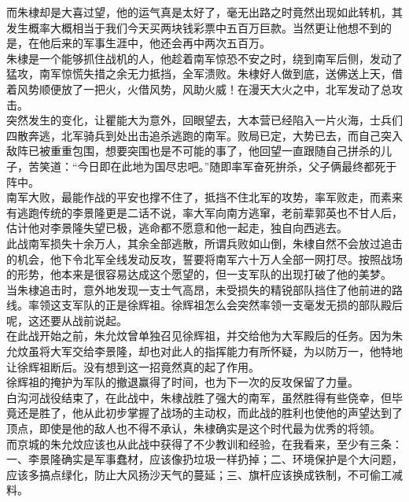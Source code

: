\begin{multicols}{\theparacolNo}
而朱棣却是大喜过望，他的运气真是太好了，毫无出路之时竟然出现如此转机，其发生概率大概相当于我们今天买两块钱彩票中五百万巨款。当然更让他想不到的是，在他后来的军事生涯中，他还会再中两次五百万。\\

朱棣是一个能够抓住战机的人，他趁着南军惊恐不安之时，绕到南军后侧，发动了猛攻，南军惊慌失措之余无力抵挡，全军溃败。朱棣好人做到底，送佛送上天，借着风势顺便放了一把火，火借风势，风助火威！在漫天大火之中，北军发动了总攻击。\\

突然发生的变化，让瞿能大为意外，回眼望去，大本营已经陷入一片火海，士兵们四散奔逃，北军骑兵到处出击追杀逃跑的南军。败局已定，大势已去，而自己突入敌阵已被重重包围，想要突围也是不可能的事了，他回望一直跟随自己拼杀的儿子，苦笑道：“今日即在此地为国尽忠吧。”随即率军奋死拚杀，父子俩最终都死于阵中。\\

南军大败，最能作战的平安也撑不住了，抵挡不住北军的攻势，率军败走，而素来有逃跑传统的李景隆更是二话不说，率大军向南方逃窜，老前辈郭英也不甘人后，估计他对李景隆失望已极，逃命都不愿意和他一起走，独自向西逃去。\\

此战南军损失十余万人，其余全部逃散，所谓兵败如山倒，朱棣自然不会放过追击的机会，他下令北军全线发动反攻，誓要将南军六十万人全部一网打尽。按照战场的形势，他本来是很容易达成这个愿望的，但一支军队的出现打破了他的美梦。\\

当朱棣追击时，意外地发现一支士气高昂，未受损失的精锐部队挡住了他前进的路线。率领这支军队的正是徐辉祖。徐辉祖怎么会突然率领一支毫发无损的部队殿后呢，这还要从战前说起。\\

在此战开始之前，朱允炆曾单独召见徐辉祖，并交给他为大军殿后的任务。因为朱允炆虽将大军交给李景隆，却也对此人的指挥能力有所怀疑，为以防万一，他特地让徐辉祖断后。没有想到这一招竟然真的起了作用。\\

徐辉祖的掩护为军队的撤退赢得了时间，也为下一次的反攻保留了力量。\\

白沟河战役结束了，在此战中，朱棣战胜了强大的南军，虽然胜得有些侥幸，但毕竟还是胜了，他从此初步掌握了战场的主动权，而此战的胜利也使他的声望达到了顶点，即使是他的敌人也不得不承认，朱棣确实是这个时代最为优秀的将领。\\

而京城的朱允炆应该也从此战中获得了不少教训和经验，在我看来，至少有三条：一、李景隆确实是军事蠢材，应该像扔垃圾一样扔掉；二、环境保护是个大问题，应该多搞点绿化，防止大风扬沙天气的蔓延；三、旗杆应该换成铁制，不可偷工减料。\\


\end{multicols}
